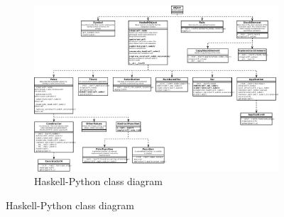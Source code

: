 \begin{figure}
\begin{figure}[H]
\centering
\includegraphics[width=\textheight]{../diags/core-interp.pdf}

\caption{Haskell-Python class diagram}
\label{fig:coreinterp}

\end{figure}
\end{figure}


